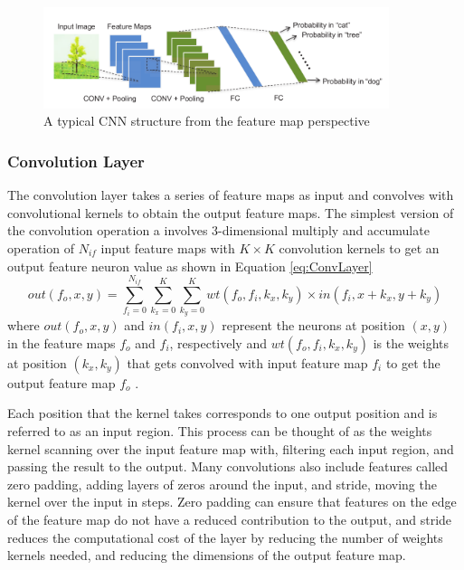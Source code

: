 \documentclass[12pt]{article}
\begin{document}
\begin{figure} [H]
\centering
\includegraphics[width=0.9\textwidth]{figures/typicalCnn}
\caption{A typical CNN structure from the feature map perspective \cite{embeddedFpgaCnn} \label{fig:typicalCNN}}
\end{figure}

\subsubsection{Convolution Layer}
\label{sec:Background-CNN-Conv}

The convolution layer takes a series of feature maps as input and convolves with convolutional kernels to obtain the output feature maps. The simplest version of the convolution operation a involves 3-dimensional multiply and accumulate operation of $N_{if}$ input feature maps with $K\times K$ convolution kernels to get an output feature neuron value as shown in Equation \ref{eq:ConvLayer}
\begin{equation}
out(f_o,x,y)=\sum^{N_{if}}_{f_i=0} \sum^{K}_{k_x=0} \sum^{K}_{k_y=0} wt(f_o,f_i,k_x,k_y)\times in(f_i,x+k_x,y+k_y)
\label{eq:ConvLayer}
\end{equation}
where $out(f_o,x,y)$ and $in(f_i,x,y)$ represent the neurons at position $(x,y)$ in the feature maps $f_o$ and $f_i$, respectively and $wt(f_o,f_i,k_x,k_y)$ is the weights at position $(k_x,k_y)$ that gets convolved with input feature map $f_i$ to get the output feature map $f_o$ \cite{SudaFpgaAccelerator}.

Each position that the kernel takes corresponds to one output position and is referred to as an input region. This process can be thought of as the weights kernel scanning over the input feature map with, filtering each input region, and passing the result to the output. Many convolutions also include features called zero padding, adding layers of zeros around the input, and stride, moving the kernel over the input in steps. Zero padding can ensure that features on the edge of the feature map do not have a reduced contribution to the output, and stride reduces the computational cost of the layer by reducing the number of weights kernels needed, and reducing the dimensions of the output feature map.
\end{document}

